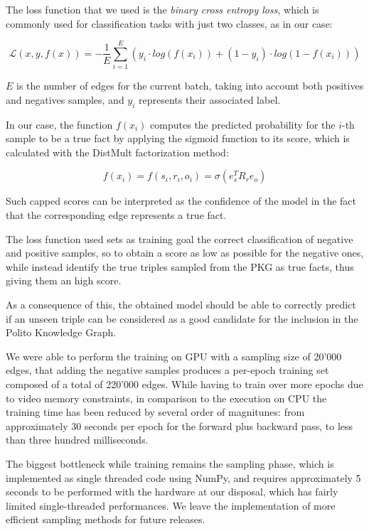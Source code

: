 \documentclass[%
    corpo=13.5pt,
    twoside,
    oldstyle,
    tipotesi=magistrale,
    greek,
    evenboxes
]{toptesi}
\begin{document}
The loss function that we used is the \emph{binary cross entropy loss}, which is
commonly used for classification tasks with just two classes, as in our case:

\begin{equation}
    \mathcal{L} \left( x, y, f(x) \right) =
        - \frac{1}{E} \sum_{i=1}^{E} \left(
        y_i \cdot log(f(x_i)) +
        (1-y_i) \cdot log(1-f(x_i))
    \right)
\end{equation}

$E$ is the number of edges for the current batch, taking into account both
positives and negatives samples, and $y_i$ represents their associated label.

In our case, the function $f(x_i)$ computes the predicted probability for the
$i$-th sample to be a true fact by applying the sigmoid function to its score,
which is calculated with the DistMult factorization method:

\begin{equation}
    f(x_i) = f(s_i,r_i,o_i) = \sigma \left( e_s^T R_r e_o \right)
\end{equation}

Such capped scores can be interpreted as the confidence of the model in the
fact that the corresponding edge represents a true fact.

The loss function used sets as training goal the correct classification of
negative and positive samples, so to obtain a score as low as possible for the
negative ones, while instead identify the true triples sampled from the PKG as
true facts, thus giving them an high score.

As a consequence of this, the obtained model should be able to correctly
predict if an unseen triple can be considered as a good candidate for the
inclusion in the Polito Knowledge Graph.
\newline

We were able to perform the training on GPU with a sampling size of 20'000 edges,
that adding the negative samples produces a per-epoch training set composed of
a total of 220'000 edges. While having to train over more epochs due to video
memory constraints, in comparison to the execution on CPU the training time
has been reduced by several order of magnitunes: from approximately 30 seconds
per epoch for the forward plus backward pass, to less than three hundred
milliseconds.

The biggest bottleneck while training remains the sampling phase, which is
implemented as single threaded code using NumPy\cite{oliphant2006}, and
requires approximately 5 seconds to be performed with the hardware at our
disposal, which has fairly limited single-threaded performances. We
leave the implementation of more efficient sampling methods for future releases.
\end{document}
